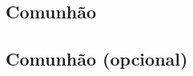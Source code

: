 \AllowPageFlush

\subsection{Comunhão}\label{subsection:tempus-paschale/dominica-pentecostes/communio}

\AllowPageFlush

\subsection{Comunhão (opcional)}\label{subsection:tempus-paschale/dominica-pentecostes/communio-ad-libitum}

